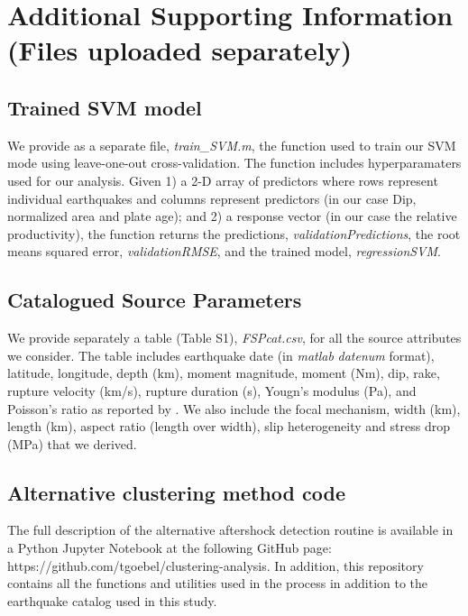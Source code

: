 \documentclass[draft]{agujournal}
\begin{document}
\section{Additional Supporting Information (Files uploaded separately)}\label{sec:additional}
\subsection{Trained SVM model}\label{sec:trained}
We provide as a separate file, \textit{train\_SVM.m}, the function used to train our SVM mode using leave-one-out cross-validation. The function includes hyperparamaters used for our analysis. Given 1) a 2-D array of predictors where rows represent individual earthquakes and columns represent predictors (in our case Dip, normalized area and plate age); and 2) a response vector (in our case the relative productivity), the function returns the predictions, \textit{validationPredictions}, the root means squared error, \textit{validationRMSE}, and the trained model, \textit{regressionSVM}.

\subsection{Catalogued Source Parameters}\label{sec:source}

We provide separately a table (Table S1), \textit{FSPcat.csv}, for all the source attributes we consider. The table includes earthquake date (in \textit{matlab} \textit{datenum} format), latitude, longitude, depth (km), moment magnitude, moment (Nm), dip, rake, rupture velocity (km/s), rupture duration (s), Yougn's modulus (Pa), and Poisson's ratio as reported by \citet{Hayes2017}. We also include the focal mechanism, width (km), length (km), aspect ratio (length over width), slip heterogeneity and stress drop (MPa) that we derived.

\subsection{Alternative clustering method code}\label{sec:aftershock}
The full description of the alternative aftershock detection routine is  available in a Python Jupyter Notebook at the following GitHub page: https://github.com/tgoebel/clustering-analysis. In addition, this repository contains all the functions and utilities used in the process in addition to the earthquake catalog used in this study. 



\end{document}
